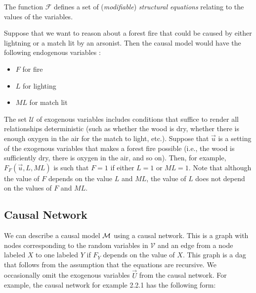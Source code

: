 The function $\mathcal{F}$ defines a set of (\textit{modifiable}) \textit{structural equations} relating to the values of the variables.

\begin{example}
    Suppose that we want to reason about a forest fire that could
    be caused by either lightning or a match lit by an arsonist.
    Then the causal model would have the following endogenous variables :
    \begin{itemize}
        \item $F$ for fire
        \item $L$ for lighting
        \item $ML$ for match lit
    \end{itemize}
    The set $\mathcal{U}$ of exogenous variables includes conditions
    that suffice to render all relationships deterministic (such as
    whether the wood is dry, whether there is enough oxygen in the air
    for the match to light, etc.).
    Suppose that $\vec u$ is a setting of the exogenous variables that
    makes a forest fire possible (i.e., the wood is sufficiently dry,
    there is oxygen in the air, and so on).
    Then, for example, $F_F(\vec u, L, ML)$ is such that $F=1$ if either
    $L=1$ or $ML=1$.
    Note that although the value of $F$ depends on the value $L$ and $ML$, the value of $L$ does not depend on the values of $F$ and $ML$.
\end{example}

\subsection{Causal Network}
We can describe a causal model $\mathcal{M}$ using a causal network.
This is a graph with nodes corresponding to the random variables
in $\mathcal{V}$ and an edge from a node labeled $X$ to one
labeled $Y$ if $F_Y$ depends on the value of $X$.
This graph is a dag that follows from the assumption that the
equations are recursive.
We occasionally omit the exogenous variables $\vec U$ from the causal network.
For example, the causal network for example 2.2.1 has the following
form:

\begin{center}
\end{center}

